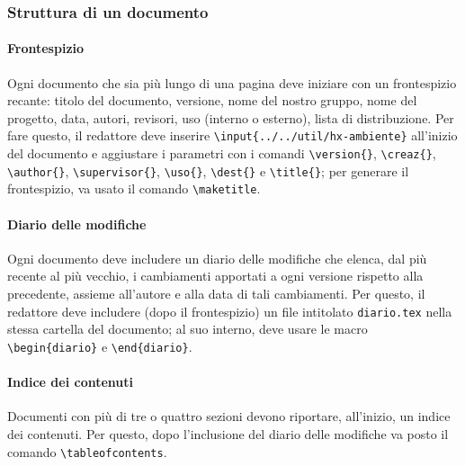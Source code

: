 \subsubsection{Struttura di un documento}
\paragraph{Frontespizio} Ogni documento che sia più lungo di una pagina deve iniziare con un frontespizio recante: titolo del documento, versione, nome del nostro gruppo, nome del progetto, data, autori, revisori, uso (interno o esterno), lista di distribuzione. Per fare questo, il redattore deve inserire \texttt{\textbackslash input\{../../util/hx-ambiente\}} all'inizio del documento e aggiustare i parametri con i comandi \texttt{\textbackslash version\{\}}, \texttt{\textbackslash creaz\{\}}, \texttt{\textbackslash author\{\}}, \texttt{\textbackslash supervisor\{\}}, \texttt{\textbackslash uso\{\}}, \texttt{\textbackslash dest\{\}} e \texttt{\textbackslash title\{\}}; per generare il frontespizio, va usato il comando \texttt{\textbackslash maketitle}.
\paragraph{Diario delle modifiche} Ogni documento deve includere un diario delle modifiche che elenca, dal più recente al più vecchio, i cambiamenti apportati a ogni versione rispetto alla precedente, assieme all'autore e alla data di tali cambiamenti. Per questo, il redattore deve includere (dopo il frontespizio) un file intitolato \texttt{diario.tex} nella stessa cartella del documento; al suo interno, deve usare le macro \texttt{\textbackslash begin\{diario\}} e \texttt{\textbackslash end\{diario\}}.
\paragraph{Indice dei contenuti} Documenti con più di tre o quattro sezioni devono riportare, all'inizio, un indice dei contenuti. Per questo, dopo l'inclusione del diario delle modifiche va posto il comando \texttt{\textbackslash tableofcontents}.

